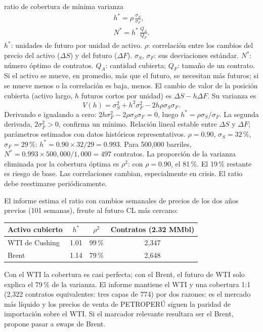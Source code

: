 \begin{ficha}{ratio de cobertura de mínima varianza}
\begin{gather*}
h^*=\rho\,\frac{\sigma_S}{\sigma_F},\\
N^*=h^*\,\frac{Q_A}{Q_F}.
\end{gather*}
 $h^*$: unidades de futuro por unidad de activo. $\rho$: correlación entre los cambios del precio del activo ($\Delta S$) y del futuro ($\Delta F$). $\sigma_S$, $\sigma_F$: sus desviaciones estándar. $N^*$: número óptimo de contratos. $Q_A$: cantidad cubierta; $Q_F$: tamaño de un contrato.
 Si el activo se mueve, en promedio, más que el futuro, se necesitan más futuros; si se mueve menos o la correlación es baja, menos.
 El cambio de valor de la posición cubierta (activo largo, $h$ futuros cortos por unidad) es $\Delta S-h\Delta F$. Su varianza es
\[ V(h)=\sigma_S^2+h^2\sigma_F^2-2h\rho\sigma_S\sigma_F. \]
Derivando e igualando a cero: $2h\sigma_F^2-2\rho\sigma_S\sigma_F=0$, luego $h^*=\rho\sigma_S/\sigma_F$. La segunda derivada, $2\sigma_F^2>0$, confirma un mínimo.
 Relación lineal estable entre $\Delta S$ y $\Delta F$; parámetros estimados con datos históricos representativos.
 $\rho=0.90$, $\sigma_S=32\,\%$, $\sigma_F=29\,\%$: $h^*=0.90\times32/29=0.993$. Para 500,000 barriles, $N^*=0.993\times500{,}000/1{,}000=497$ contratos.
 La proporción de la varianza eliminada por la cobertura óptima es $\rho^2$: con $\rho=0.90$, el 81\,\%. El 19\,\% restante es riesgo de base.
 Las correlaciones cambian, especialmente en crisis. El ratio debe reestimarse periódicamente.
\end{ficha}

\begin{informe}
El informe estima el ratio con cambios semanales de precios de los dos años previos (101 semanas), frente al futuro CL más cercano:
\begin{center}\small
\begin{tabular}{@{}lccc@{}}
\toprule
Activo cubierto & $h^*$ & $\rho^2$ & Contratos (2.32 MMbl)\\
\midrule
WTI de Cushing & 1.01 & 99\,\% & 2,347\\
Brent & 1.14 & 79\,\% & 2,648\\
\bottomrule
\end{tabular}
\end{center}
Con el WTI la cobertura es casi perfecta; con el Brent, el futuro de WTI solo explica el 79\,\% de la varianza. El informe mantiene el WTI y una cobertura 1:1 (2,322 contratos equivalentes: tres capas de 774) por dos razones: es el mercado más líquido y los precios de venta de PETROPERÚ siguen la paridad de importación sobre el WTI. Si el marcador relevante resultara ser el Brent, propone pasar a swaps de Brent.
\end{informe}

